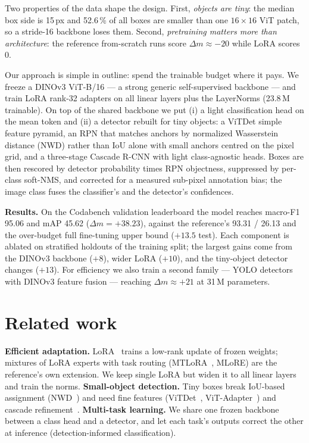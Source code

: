 \documentclass[10pt,twocolumn,letterpaper]{article}
\newcommand{\dm}{\ensuremath{\Delta m}}
\begin{document}
Two properties of the data shape the design. First, \emph{objects are tiny}:
the median box side is 15\,px and 52.6\,\% of all boxes are smaller than one
$16{\times}16$ ViT patch, so a stride-16 backbone loses them. Second,
\emph{pretraining matters more than architecture}: the reference from-scratch
runs score $\dm \approx -20$ while LoRA scores 0.

Our approach is simple in outline: spend the trainable budget where it pays.
We freeze a DINOv3 ViT-B/16 --- a strong generic self-supervised backbone ---
and train LoRA rank-32 adapters on all linear layers plus the LayerNorms
(23.8\,M trainable). On top of the shared backbone we put (i) a light
classification head on the mean token and (ii) a detector rebuilt for tiny
objects: a ViTDet simple feature pyramid, an RPN that matches anchors by
normalized Wasserstein distance (NWD) rather than IoU alone with small anchors
centred on the pixel grid, and a three-stage Cascade R-CNN with light
class-agnostic heads. Boxes are then rescored by detector probability times
RPN objectness, suppressed by per-class soft-NMS, and corrected for a measured
sub-pixel annotation bias; the image class fuses the classifier's and the
detector's confidences.

\textbf{Results.} On the Codabench validation leaderboard the model reaches
macro-F1 95.06 and mAP 45.62 ($\dm = +38.23$), against the reference's 93.31 /
26.13 and the over-budget full fine-tuning upper bound ($+13.5$ test). Each
component is ablated on stratified holdouts of the training split; the largest
gains come from the DINOv3 backbone ($+8$), wider LoRA ($+10$), and the
tiny-object detector changes ($+13$). For efficiency we also train a second
family --- YOLO detectors with DINOv3 feature fusion --- reaching
$\dm \approx +21$ at 31\,M parameters.

\section{Related work}
\label{sec:related}
\textbf{Efficient adaptation.} LoRA~\cite{hu2022lora} trains a low-rank update
of frozen weights; mixtures of LoRA experts with task routing
(MTLoRA~\cite{agiza2024mtlora}, MLoRE) are the reference's own extension. We
keep single LoRA but widen it to all linear layers and train the norms.
\textbf{Small-object detection.} Tiny boxes break IoU-based assignment
(NWD~\cite{wang2021nwd}) and need fine features (ViTDet~\cite{li2022vitdet},
ViT-Adapter~\cite{chen2023vitadapter}) and cascade refinement~\cite{cai2018cascade}.
\textbf{Multi-task learning.} We share one frozen backbone between a class head
and a detector, and let each task's outputs correct the other at inference
(detection-informed classification).
\end{document}

